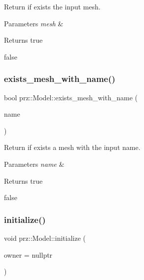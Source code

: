 Return if exists the input mesh. 


\begin{DoxyParams}{Parameters}
{\em mesh} & \\
\hline
\end{DoxyParams}
\begin{DoxyReturn}{Returns}
true 

false 
\end{DoxyReturn}
\mbox{\label{classprz_1_1_model_aa13ec4e2bc7c299f10806ced907eb198}} 
\subsubsection{\texorpdfstring{exists\_mesh\_with\_name()}{exists\_mesh\_with\_name()}}
{\footnotesize\ttfamily bool prz\+::\+Model\+::exists\+\_\+mesh\+\_\+with\+\_\+name (\begin{DoxyParamCaption}\item[{const P\+String \&}]{name }\end{DoxyParamCaption})\hspace{0.3cm}{\ttfamily [inline]}}



Return if exists a mesh with the input name. 


\begin{DoxyParams}{Parameters}
{\em name} & \\
\hline
\end{DoxyParams}
\begin{DoxyReturn}{Returns}
true 

false 
\end{DoxyReturn}
\mbox{\label{classprz_1_1_model_a88179eb2baaa2186479234d252612ea3}} 
\subsubsection{\texorpdfstring{initialize()}{initialize()}}
{\footnotesize\ttfamily void prz\+::\+Model\+::initialize (\begin{DoxyParamCaption}\item[{\mbox{\hyperlink{classprz_1_1_entity}{Entity}} $\ast$}]{owner = {\ttfamily nullptr} }\end{DoxyParamCaption})\hspace{0.3cm}{\ttfamily [inline]}}




